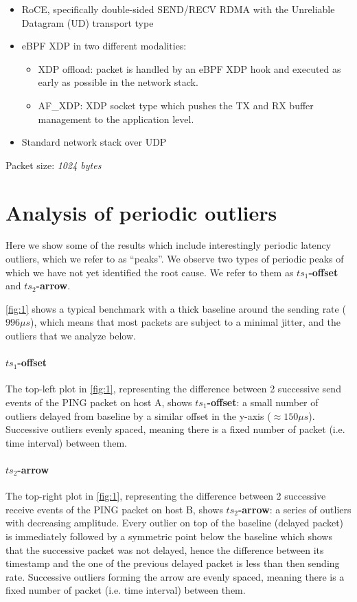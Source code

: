 \documentclass{article}
\begin{document}
\begin{itemize}
  \vspace{-0.8mm}
  \itemsep=-0.4mm
  \item RoCE, specifically double-sided SEND/RECV RDMA with the Unreliable Datagram (UD) 
  transport type
  \item eBPF XDP in two different modalities:
  \vspace{-1.8mm}
  \begin{itemize}
    \itemsep=-0.5mm
    \item XDP offload: packet is handled by an eBPF XDP hook and executed as early
    as possible in the network stack. 
    \item AF\_XDP: XDP socket type which pushes the TX and RX buffer management to 
    the application level.
  \end{itemize}
    \item Standard network stack over UDP    
\end{itemize}

\noindent
Packet size: \textit{1024 bytes}


\section{Analysis of periodic outliers}
Here we show some of the results which include interestingly periodic latency 
outliers, which we refer to as ``peaks''. We observe two types of periodic peaks 
of which we have not yet identified the root
cause. We refer to them as \textbf{$ts_1$-offset} and \textbf{$ts_2$-arrow}.

\autoref{fig:1} shows a typical benchmark with a thick baseline around the 
sending rate ($996\mu s$), which means that most packets are subject to a minimal 
jitter, and the outliers that we analyze below.

\paragraph*{$ts_1$-offset} The top-left plot in \autoref{fig:1}, representing the difference
between 2 successive send events of the PING packet on host A, shows 
\textbf{$ts_1$-offset}:
a small number of outliers delayed from baseline by a similar offset in the 
y-axis ($\approx150\mu s$). Successive outliers evenly spaced, meaning there is a 
fixed number of packet (i.e. time interval) between them. 

\paragraph*{$ts_2$-arrow} The top-right plot in \autoref{fig:1}, representing 
the difference 
between 2 successive receive events of the PING packet on host B, shows 
\textbf{$ts_2$-arrow}: a 
series of outliers with decreasing amplitude. Every outlier on top of the 
baseline (delayed packet) is immediately followed by a symmetric point below the
baseline which shows that the successive packet was not delayed, hence the 
difference between its timestamp and the one of the previous delayed packet is
less than then sending rate. 
Successive outliers forming the arrow are evenly spaced, meaning there is a 
fixed number of packet (i.e. time interval) between them. 
\end{document}
